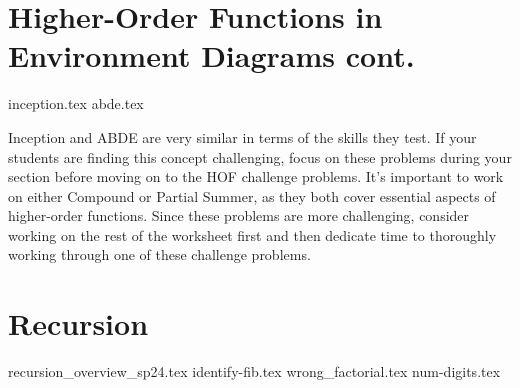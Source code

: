 \documentclass{exam}
\begin{document}
\begin{questions}
    \section{Higher-Order Functions in Environment Diagrams cont.}
    {inception.tex}
    {abde.tex}
    \begin{questionmeta}
        Inception and ABDE are very similar in terms of the skills they test. If your students are finding this concept challenging, focus on these problems during your section before moving on to the HOF challenge problems. It's important to work on either Compound or Partial Summer, as they both cover essential aspects of higher-order functions. Since these problems are more challenging, consider working on the rest of the worksheet first and then dedicate time to thoroughly working through one of these challenge problems.
    \end{questionmeta}

    \section{Recursion}
    {recursion_overview_sp24.tex}
    {identify-fib.tex}
    {wrong_factorial.tex}
    {num-digits.tex}
\end{questions}
\end{document}
